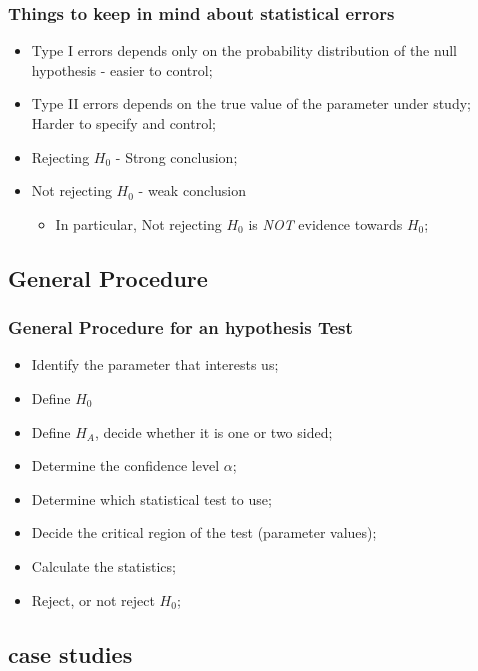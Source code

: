 \documentclass[10pt]{beamer}
\begin{document}
\begin{frame}
  \frametitle{Things to keep in mind about statistical errors}
  \begin{itemize}
    \item Type I errors depends only on the probability distribution
      of the null hypothesis - easier to control;
    \item Type II errors depends on the true value of the parameter
      under study; Harder to specify and control;
    \item Rejecting $H_0$ - Strong conclusion;
    \item Not rejecting $H_0$ - weak conclusion
      \begin{itemize}
        \item In particular, Not rejecting $H_0$ is {\it NOT} evidence
          towards $H_0$;
      \end{itemize}
  \end{itemize}
\end{frame}


\subsection{General Procedure}

\begin{frame}
  \frametitle{General Procedure for an hypothesis Test}
  \begin{itemize}
    \item Identify the parameter that interests us;
    \item Define $H_0$
    \item Define $H_A$, decide whether it is one or two sided;
    \item Determine the confidence level $\alpha$;
    \item Determine which statistical test to use;
    \item Decide the critical region of the test (parameter values);
    \item Calculate the statistics;
    \item Reject, or not reject $H_0$;
  \end{itemize}
\end{frame}

\subsection{case studies}
\end{document}
